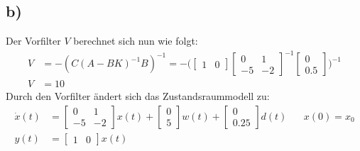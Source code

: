 \documentclass[11pt]{scrartcl} %
\begin{document}
\subsection*{b)}
Der Vorfilter $V$ berechnet sich nun wie folgt:
\begin{align*}
	V&=-(C(A-BK)^{-1}B)^{-1}=-\Biggl(\begin{bmatrix}1&0\end{bmatrix}\begin{bmatrix}0&1\\-5&-2\end{bmatrix}^{-1}\begin{bmatrix}0\\0.5\end{bmatrix}\Biggr)^{-1}\\
	V&=10
\end{align*}
Durch den Vorfilter ändert sich das Zustandsraummodell zu:
\begin{align*}
	\dot{x}(t)&=\begin{bmatrix}0&1\\-5&-2\end{bmatrix}x(t)+\begin{bmatrix}0\\5\end{bmatrix}w(t)+\begin{bmatrix}0\\0.25\end{bmatrix}d(t)\hspace{20pt} x(0)=x_0\\
	y(t)&=\begin{bmatrix}1&0\end{bmatrix}x(t)
\end{align*}
\end{document}
